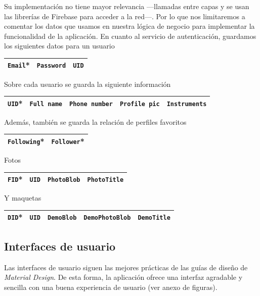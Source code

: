 \documentclass[a4paper,12pt]{article}
\begin{document}
Su implementación no tiene mayor relevancia ---llamadas entre capas y se usan las librerías de Firebase para acceder a la red---. Por lo que nos limitaremos a comentar los datos que usamos en nuestra lógica de negocio para implementar la funcionalidad de la aplicación. En cuanto al servicio de autenticación, guardamos los siguientes datos para un usuario
\begin{table}[H]
	\centering
	\begin{tabular}{|l|l|l|}
		\hline
		\texttt{Email}* &
		\texttt{Password} &
		\texttt{UID} \\
		\hline
	\end{tabular}
\end{table}

Sobre cada usuario se guarda la siguiente información
\begin{table}[H]
	\centering
	\begin{tabular}{|l|l|l|l|l|}
		\hline
		\texttt{UID}* &
		\texttt{Full name} &
		\texttt{Phone number} &
		\texttt{Profile pic} &
		\texttt{Instruments}\\
		\hline
	\end{tabular}
\end{table}

Además, también se guarda la relación de perfiles favoritos
\begin{table}[H]
	\centering
	\begin{tabular}{|l|l|}
		\hline
		\texttt{Following}* &
		\texttt{Follower}*\\
		\hline
	\end{tabular}
\end{table}

Fotos
\begin{table}[H]
	\centering
	\begin{tabular}{|l|l|l|l|}
		\hline
		\texttt{FID}* &
		\texttt{UID} &
		\texttt{PhotoBlob} &
		\texttt{PhotoTitle}\\
		\hline
	\end{tabular}
\end{table}

Y maquetas
\begin{table}[H]
	\centering
	\begin{tabular}{|l|l|l|l|l|}
		\hline
		\texttt{DID}* &
		\texttt{UID} &
		\texttt{DemoBlob} &
		\texttt{DemoPhotoBlob} &
		\texttt{DemoTitle}\\
		\hline
	\end{tabular}
\end{table}
\subsection{Interfaces de usuario}
Las interfaces de usuario siguen las mejores prácticas de las guías de diseño de \textit{Material Design}. De esta forma, la aplicación ofrece una interfaz agradable y sencilla con una buena experiencia de usuario (ver anexo de figuras).
\end{document}
